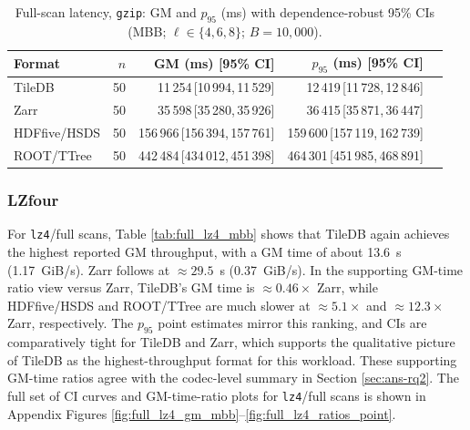 \documentclass[nomenclature, english, bibtex]{kththesis}
\numberwithin{listing}{chapter}
\begin{document}
\begin{table}[H]
  \centering
  \caption{Full-scan latency, \texttt{gzip}: \gls{GM} and $p_{95}$ (ms) with dependence-robust 95\% CIs (\gls{MBB}; $\ell\in\{4,6,8\}$; $B{=}10{,}000$).}
  \label{tab:full_gzip_mbb}
  \begin{tabular}{lrrrr}
    \toprule
    Format & $n$ & \gls{GM} (ms) [95\% \gls{CI}] & $p_{95}$ (ms) [95\% \gls{CI}] \\
    \midrule
    TileDB & 50 & 11\,254\,[10\,994,\,11\,529] & 12\,419\,[11\,728,\,12\,846] \\
    Zarr   & 50 & 35\,598\,[35\,280,\,35\,926] & 36\,415\,[35\,871,\,36\,447] \\
    \gls{HDFfive}/\gls{HSDS}   & 50 & 156\,966\,[156\,394,\,157\,761] & 159\,600\,[157\,119,\,162\,739] \\
    \gls{ROOT}/\gls{TTree}   & 50 & 442\,484\,[434\,012,\,451\,398] & 464\,301\,[451\,985,\,468\,891] \\
    \bottomrule
  \end{tabular}
\end{table}



\subsubsection{\texorpdfstring{\gls{LZfour}}{LZ4}}
For \texttt{lz4}/full scans, Table \ref{tab:full_lz4_mbb} shows that TileDB again achieves the highest reported \gls{GM} throughput, with a \gls{GM} time of about 13.6~s (1.17~GiB/s). Zarr follows at $\approx 29.5$~s (0.37~GiB/s). In the supporting \gls{GM}-time ratio view versus Zarr, TileDB’s \gls{GM} time is $\approx 0.46\times$ Zarr, while \gls{HDFfive}/\gls{HSDS} and \gls{ROOT}/\gls{TTree} are much slower at $\approx 5.1\times$ and $\approx 12.3\times$ Zarr, respectively. The $p_{95}$ point estimates mirror this ranking, and CIs are comparatively tight for TileDB and Zarr, which supports the qualitative picture of TileDB as the highest-throughput format for this workload. These supporting \gls{GM}-time ratios agree with the codec-level summary in Section \ref{sec:ans-rq2}. The full set of \gls{CI} curves and \gls{GM}-time-ratio plots for \texttt{lz4}/full scans is shown in Appendix Figures \ref{fig:full_lz4_gm_mbb}–\ref{fig:full_lz4_ratios_point}.
\end{document}
